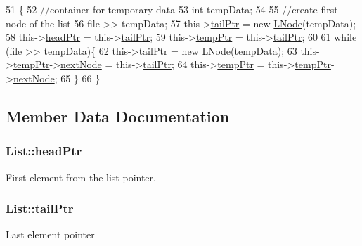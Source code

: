 \begin{DoxyCode}
51                               \{
52     \textcolor{comment}{//container for temporary data}
53     \textcolor{keywordtype}{int} tempData;
54 
55     \textcolor{comment}{//create first node of the list}
56     file >> tempData;
57     this->\hyperlink{class_list_a73c6ff858ccd116181acc4795bd1ed58}{tailPtr} = \textcolor{keyword}{new} \hyperlink{class_l_node}{LNode}(tempData);
58     this->\hyperlink{class_list_a5610353d95d627beab38b7366921e0c3}{headPtr} = this->\hyperlink{class_list_a73c6ff858ccd116181acc4795bd1ed58}{tailPtr};
59     this->\hyperlink{class_list_a9a3a51357cab8c53233ba00b8545eb5a}{tempPtr} = this->\hyperlink{class_list_a73c6ff858ccd116181acc4795bd1ed58}{tailPtr};
60 
61     \textcolor{keywordflow}{while} (file >> tempData)\{
62         this->\hyperlink{class_list_a73c6ff858ccd116181acc4795bd1ed58}{tailPtr} = \textcolor{keyword}{new} \hyperlink{class_l_node}{LNode}(tempData);
63         this->\hyperlink{class_list_a9a3a51357cab8c53233ba00b8545eb5a}{tempPtr}->\hyperlink{class_l_node_a4c8c3667cfa6a78673b91fa6a5bb93e6}{nextNode} = this->\hyperlink{class_list_a73c6ff858ccd116181acc4795bd1ed58}{tailPtr};
64         this->\hyperlink{class_list_a9a3a51357cab8c53233ba00b8545eb5a}{tempPtr} = this->\hyperlink{class_list_a9a3a51357cab8c53233ba00b8545eb5a}{tempPtr}->\hyperlink{class_l_node_a4c8c3667cfa6a78673b91fa6a5bb93e6}{nextNode};
65     \}
66 \}\end{DoxyCode}


\subsection{Member Data Documentation}
\hypertarget{class_list_a5610353d95d627beab38b7366921e0c3}{}
\subsubsection[{head\+Ptr}]{\setlength{\rightskip}{0pt plus 5cm}List\+::head\+Ptr\hspace{0.3cm}{\ttfamily [private]}}\label{class_list_a5610353d95d627beab38b7366921e0c3}
First element from the list pointer. \hypertarget{class_list_a73c6ff858ccd116181acc4795bd1ed58}{}
\subsubsection[{tail\+Ptr}]{\setlength{\rightskip}{0pt plus 5cm}List\+::tail\+Ptr\hspace{0.3cm}{\ttfamily [private]}}\label{class_list_a73c6ff858ccd116181acc4795bd1ed58}
Last element pointer \hypertarget{class_list_a9a3a51357cab8c53233ba00b8545eb5a}{}
